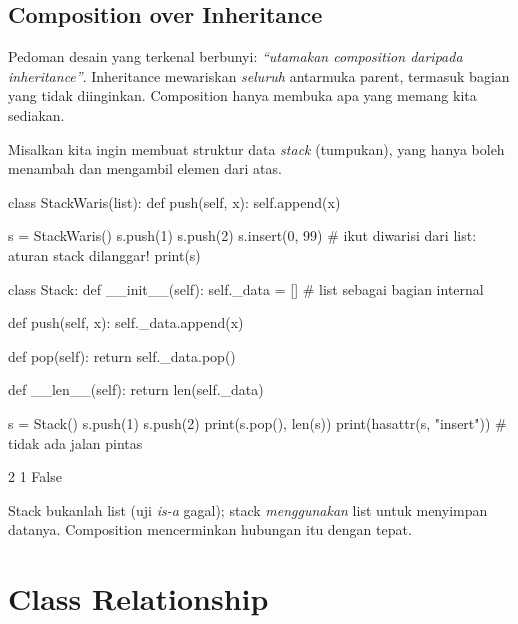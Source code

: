 \subsection{Composition over Inheritance}

Pedoman desain yang terkenal berbunyi: \emph{``utamakan composition daripada inheritance''}. Inheritance mewariskan \emph{seluruh} antarmuka parent, termasuk bagian yang tidak diinginkan. Composition hanya membuka apa yang memang kita sediakan.

Misalkan kita ingin membuat struktur data \emph{stack} (tumpukan), yang hanya boleh menambah dan mengambil elemen dari atas.

\begin{kode}
class StackWaris(list):
    def push(self, x):
        self.append(x)

s = StackWaris()
s.push(1)
s.push(2)
s.insert(0, 99)          # ikut diwarisi dari list: aturan stack dilanggar!
print(s)
\end{kode}

\begin{keluaran}
[99, 1, 2]
\end{keluaran}

\begin{kode}
class Stack:
    def __init__(self):
        self._data = []                # list sebagai bagian internal

    def push(self, x):
        self._data.append(x)

    def pop(self):
        return self._data.pop()

    def __len__(self):
        return len(self._data)

s = Stack()
s.push(1)
s.push(2)
print(s.pop(), len(s))
print(hasattr(s, "insert"))           # tidak ada jalan pintas
\end{kode}

\begin{keluaran}
2 1
False
\end{keluaran}

Stack bukanlah list (uji \emph{is-a} gagal); stack \emph{menggunakan} list untuk menyimpan datanya. Composition mencerminkan hubungan itu dengan tepat.

\section{Class Relationship}

